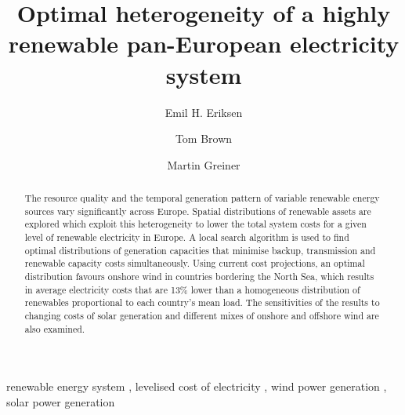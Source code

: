 \documentclass[a4paper, 5p, sort&compress]{elsarticle}%
\begin{document}

\begin{frontmatter}

\title{Optimal heterogeneity of a highly renewable pan-European electricity system}

\author[label1]{Emil H. Eriksen}
\author[label2]{Tom Brown}
\author[label3]{Martin Greiner}
\address[label1]{Department of Physics and Astronomy, Aarhus University, 8000 Aarhus C,  Denmark}
\address[label2]{Frankfurt Institute of Advanced Studies (FIAS), Johann Wolfgang Goethe Universit\"at, Ruth-Moufang-Straße 1, 60438 Frankfurt am Main, Germany}
\address[label3]{Department of Engineering, Aarhus University, 8200 Aarhus,  Denmark}



\begin{abstract}
  The resource quality and the temporal generation pattern of variable
  renewable energy sources vary significantly across Europe. Spatial
  distributions of renewable assets are explored which exploit this
  heterogeneity to lower the total system costs for a given level of
  renewable electricity in Europe. A local search algorithm is used to
  find optimal distributions of generation capacities that minimise
  backup, transmission and renewable capacity costs
  simultaneously. Using current cost projections, an optimal
  distribution favours onshore wind in countries bordering the North
  Sea, which results in average electricity costs that are 13\% lower
  than a homogeneous distribution of renewables proportional to each
  country's mean load. The sensitivities of the results to changing
  costs of solar generation and different mixes of onshore and
  offshore wind are also examined.

\end{abstract}

\begin{keyword}
renewable energy system \sep
levelised cost of electricity \sep
wind power generation \sep
solar power generation
\end{keyword}

\end{frontmatter}


\end{document}
